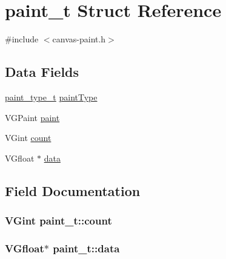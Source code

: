 \hypertarget{structpaint__t}{}\section{paint\+\_\+t Struct Reference}
\label{structpaint__t}


{\ttfamily \#include $<$canvas-\/paint.\+h$>$}

\subsection*{Data Fields}
\begin{DoxyCompactItemize}
\item 
\hyperlink{canvas-paint_8h_a2d52f465c03f4e659488016e2d62633d}{paint\+\_\+type\+\_\+t} \hyperlink{structpaint__t_a1847b9704a2a157bd821f0c81a58a39d}{paint\+Type}
\item 
V\+G\+Paint \hyperlink{structpaint__t_a4e1356c7f535abd01d52e5f0a080a2fd}{paint}
\item 
V\+Gint \hyperlink{structpaint__t_acd3c13bbef8223dd0f762c302dd0be7e}{count}
\item 
V\+Gfloat $\ast$ \hyperlink{structpaint__t_a84bb01c606d50181f00631a540a87af8}{data}
\end{DoxyCompactItemize}


\subsection{Field Documentation}
\hypertarget{structpaint__t_acd3c13bbef8223dd0f762c302dd0be7e}{}
\subsubsection[{count}]{\setlength{\rightskip}{0pt plus 5cm}V\+Gint paint\+\_\+t\+::count}\label{structpaint__t_acd3c13bbef8223dd0f762c302dd0be7e}
\hypertarget{structpaint__t_a84bb01c606d50181f00631a540a87af8}{}
\subsubsection[{data}]{\setlength{\rightskip}{0pt plus 5cm}V\+Gfloat$\ast$ paint\+\_\+t\+::data}\label{structpaint__t_a84bb01c606d50181f00631a540a87af8}
\hypertarget{structpaint__t_a4e1356c7f535abd01d52e5f0a080a2fd}{}

